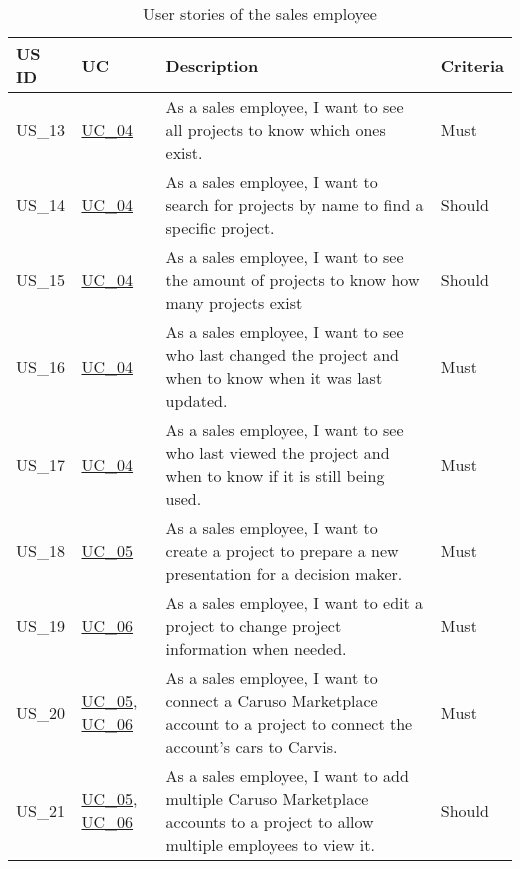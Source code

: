   \sffamily
  \begin{footnotesize}
    \begin{longtable}[L L L L]{ p{} p{} p{} p{} }
      \caption                       %
          {User stories of the sales employee} %
          \\
      \toprule
      \textbf{US ID} & \textbf{UC} & \textbf{Description} & \textbf{Criteria} \\
      \midrule
      \hypertarget{Ref:US13}{US\_13} & \hyperlink{Ref:UC4}{UC\_04} & As a sales employee, I want to see all projects to know which ones exist. & Must \\
      \hypertarget{Ref:US14}{US\_14} & \hyperlink{Ref:UC4}{UC\_04} & As a sales employee, I want to search for projects by name to find a specific project. & Should \\
      \hypertarget{Ref:US15}{US\_15} & \hyperlink{Ref:UC4}{UC\_04} & As a sales employee, I want to see the amount of projects to know how many projects exist & Should \\
      \hypertarget{Ref:US16}{US\_16} & \hyperlink{Ref:UC4}{UC\_04} & As a sales employee, I want to see who last changed the project and when to know when it was last updated. & Must \\
      \hypertarget{Ref:US17}{US\_17} & \hyperlink{Ref:UC4}{UC\_04} & As a sales employee, I want to see who last viewed the project and when to know if it is still being used. & Must \\
      \hypertarget{Ref:US18}{US\_18} & \hyperlink{Ref:UC5}{UC\_05} & As a sales employee, I want to create a project to prepare a new presentation for a decision maker. & Must \\
      \hypertarget{Ref:US19}{US\_19} & \hyperlink{Ref:UC6}{UC\_06} & As a sales employee, I want to edit a project to change project information when needed. & Must \\
      \hypertarget{Ref:US20}{US\_20} & \hyperlink{Ref:UC5}{UC\_05}, \newline \hyperlink{Ref:UC6}{UC\_06} & As a sales employee, I want to connect a Caruso Marketplace account to a project to connect the account's cars to Carvis. & Must \\
      \hypertarget{Ref:US21}{US\_21} & \hyperlink{Ref:UC5}{UC\_05}, \newline \hyperlink{Ref:UC6}{UC\_06} & As a sales employee, I want to add multiple Caruso Marketplace accounts to a project to allow multiple employees to view it. & Should \\

\end{longtable}
\end{footnotesize}
